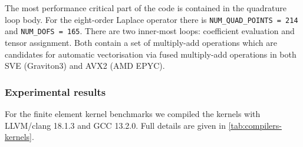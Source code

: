 The most performance critical part of the code is contained in the quadrature
loop body. For the eight-order Laplace operator there is
\lstinline{NUM_QUAD_POINTS = 214} and \lstinline{NUM_DOFS = 165}. There are two
inner-most loops: coefficient evaluation and tensor assignment. Both contain a
set of multiply-add operations which are candidates for automatic vectorisation
via fused multiply-add operations in both SVE (Graviton3) and AVX2 (AMD EPYC).

\subsubsection*{Experimental results}

For the finite element kernel benchmarks we compiled the kernels with
LLVM/clang 18.1.3 and GCC 13.2.0. Full details are given in
\autoref{tab:compilers-kernels}.

